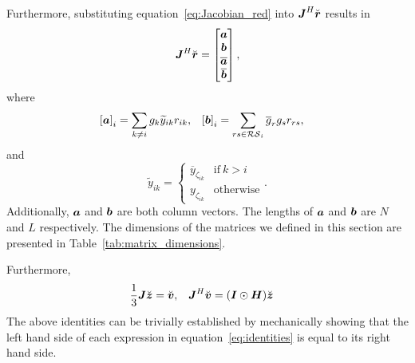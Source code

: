 \documentclass[useAMS,usenatbib]{mn2e}
\newcommand{\bz}{\bmath{z}}
\newcommand{\br}{\bmath{r}}
\newcommand{\bv}{\bmath{v}}
\newcommand{\bJ}{\bmath{J}}
\newcommand{\bH}{\bmath{H}}
\newcommand{\bI}{\bmath{I}}
\newcommand{\ba}{\bmath{a}}
\newcommand{\bb}{\bmath{b}}
\newcommand{\conj}[1]{\overline{#1}}
\begin{document}
Furthermore, substituting equation~\ref{eq:Jacobian_red} into $\bJ^H\breve{\br}$ results in
\begin{equation}
\bJ^H\breve{\br} = \begin{bmatrix}
                   \ba \\
                   \bb \\
                   \conj{\ba}\\
                   \conj{\bb}
                   \end{bmatrix},
\end{equation}
where
\begin{align}
\label{eq:ab}
\left [ \ba \right ]_i &= \sum_{k\neq i} g_k \widetilde{y}_{ik}r_{ik},  & \left [ \bb \right ]_i &= \sum_{rs\in\mathcal{RS}_i}\conj{g}_r g_s r_{rs},
\end{align}
and
\begin{equation}
\label{eq:y_tilde}
\widetilde{y}_{ik} = 
\begin{cases}
\conj{y}_{\zeta_{ik}} & \textrm{if}~k > i\\
y_{\zeta_{ik}} & \textrm{otherwise}
\end{cases}.
\end{equation}
Additionally, $\ba$ and $\bb$ are both column vectors. The lengths of $\ba$ and $\bb$ are $N$ and $L$ respectively.
The dimensions of the matrices we defined in this section are presented in Table~\ref{tab:matrix_dimensions}.

Furthermore,
\begin{align}
\label{eq:identities}
\frac{1}{3}\bJ\breve{\bz} &= \breve{\bv}, & \bJ^H\breve{\bv} &= (\bI\odot\bH)\breve{\bz} 
\end{align}
The above identities can be trivially established by mechanically showing that the left hand side of each expression in equation~\ref{eq:identities} is equal to its right hand side.
\end{document}
